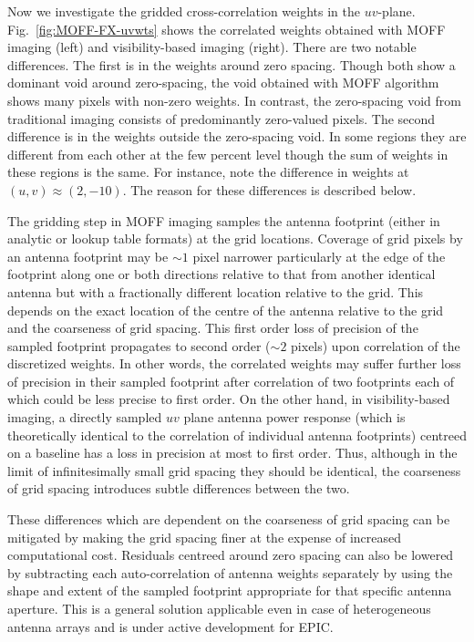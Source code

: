 \documentclass[a4paper,fleqn,usenatbib]{mnras}
\begin{document}
Now we investigate the gridded cross-correlation weights in the $uv$-plane. 
Fig.~\ref{fig:MOFF-FX-uvwts} shows the correlated weights obtained with MOFF 
imaging (left) and visibility-based imaging (right). There are two notable 
differences. The first is in the weights around zero spacing. Though both show a
dominant void around zero-spacing, the void obtained with MOFF algorithm shows 
many pixels with non-zero weights. In contrast, the zero-spacing void from 
traditional imaging consists of predominantly zero-valued pixels. The second 
difference is in the weights outside the zero-spacing void. In some regions they 
are different from each other at the few percent level though the sum of weights 
in these regions is the same. For instance, note the difference in weights at 
$(u,v)\approx (2,-10)$. The reason for these differences is described below.

The gridding step in MOFF imaging samples the antenna footprint (either in 
analytic or lookup table formats) at the grid locations. Coverage of grid pixels 
by an antenna footprint may be $\sim 1$ pixel narrower particularly at the 
edge of the footprint along one or both directions relative to that from another 
identical antenna but with a fractionally different location relative to the 
grid. This depends on the exact location of the centre of the antenna relative 
to the grid and the coarseness of grid spacing. This first order loss of 
precision of the sampled footprint propagates to second order ($\sim 2$ pixels) 
upon correlation of the discretized weights. In other words, the correlated 
weights may suffer further loss of precision in their sampled footprint after 
correlation of two footprints each of which could be less precise to first 
order. On the other hand, in visibility-based imaging, a directly sampled $uv$ 
plane antenna power response (which is theoretically identical to the correlation 
of individual antenna footprints) centreed on a baseline has a loss in precision 
at most to first order. Thus, although in the limit of infinitesimally small 
grid spacing they should be identical, the coarseness of grid spacing introduces 
subtle differences between the two.

These differences which are dependent on the coarseness of grid spacing can be 
mitigated by making the grid spacing finer at the expense of increased 
computational cost. Residuals centreed around zero spacing can also be lowered 
by subtracting each auto-correlation of antenna weights separately by using the 
shape and extent of the sampled footprint appropriate for that specific antenna 
aperture. This is a general solution applicable even in case of heterogeneous 
antenna arrays and is under active development for EPIC.
\end{document}
